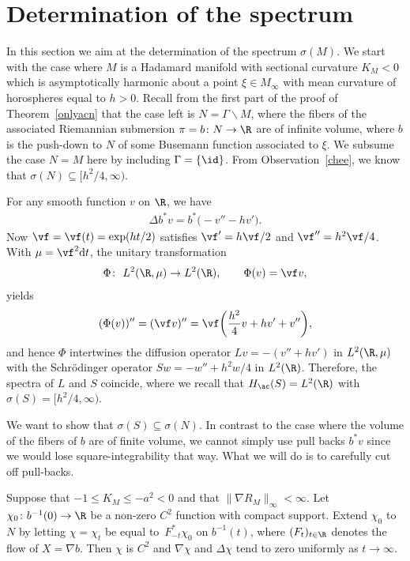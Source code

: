 \section{Determination of the spectrum}\label{secsig}

In this section we aim at the determination of the spectrum $\sigma(M)$.
We start with the case where $M$ is a Hadamard manifold with sectional curvature $K_M<0$
which is asymptotically harmonic about a point $\xi\in M_\infty$
with mean curvature of horospheres equal to $h>0$.
Recall from the first part of the proof of Theorem~\ref{onlyacn}
that the case left is $N=\Gamma\backslash M$,
where the fibers of the associated Riemannian submersion $\pi=b\colon N\to\R$ are of infinite volume,
where $b$ is the push-down to $N$ of some Busemann function associated to $\xi$.
We subsume the case $N=M$ here by including $\Gamma=\{\id\}$.
From Observation~\ref{chee}, we know that $\sigma(N)\subseteq\bigl[h^2/4,\infty\bigr)$.

For any smooth function $v$ on $\R$, we have
\begin{align*}
	\Delta b^*v = b^*\bigl(-v'' - hv'\bigr).
\end{align*}
Now $\vf=\vf(t)=\exp(ht/2)$ satisfies $\vf'=h\vf/2$ and $\vf''=h^2\vf/4$.
With $\mu=\vf^2{\rm d}t$, the unitary transformation
\begin{align*}
	\Phi \colon \ L^2(\R,\mu) \to L^2(\R), \qquad \Phi(v) = \vf v,
\end{align*}
yields
\begin{align*}
	(\Phi(v))'' = (\vf v)'' = \vf\biggl(\frac{h^2}4v + hv' + v''\biggr),
\end{align*}
and hence $\Phi$ intertwines the diffusion operator $Lv=-(v''+hv')$ in $L^2(\R,\mu)$
with the Schr\"odinger operator $Sw=-w''+h^2w/4$ in $L^2(\R)$.
Therefore, the spectra of $L$ and $S$ coincide,
where we recall that $H_{\ac}(S)=L^2(\R)$ with $\sigma(S)=\bigl[h^2/4,\infty\bigr)$.

We want to show that $\sigma(S)\subseteq\sigma(N)$.
In contrast to the case where the volume of the fibers of $b$ are of finite volume,
we cannot simply use pull backs $b^*v$ since we would lose square-integrability that way.
What we will do is to carefully cut off pull-backs.

\begin{Lemma}
Suppose that $-1\le K_M\le-a^2<0$ and that $\|\nabla R_M\|_\infty<\infty$.
Let $\chi_0\colon b^{-1}(0)\to\R$ be a non-zero $C^2$ function with compact support.
Extend $\chi_0$ to $N$ by letting $\chi=\chi_t$ be equal to~$F_{-t}^*\chi_0$ on $b^{-1}(t)$,
where $(F_t)_{t\in\R}$ denotes the flow of $X=\nabla b$.
Then $\chi$ is $C^2$ and $\nabla\chi$ and $\Delta\chi$ tend to zero uniformly as $t\to\infty$.
\end{Lemma}

